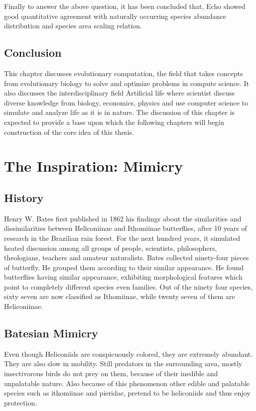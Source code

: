 \documentclass[letterpaper]{article}
\numberwithin{equation}{section}
\begin{document}
Finally to answer the above question, it has been concluded that, Echo showed good quantitative agreement with naturally occurring species abundance distribution and species area scaling relation.

\subsection{Conclusion}
This chapter discusses evolutionary computation, the field that takes concepts from evolutionary biology to solve and optimize problems in compute science. It also discusses the interdisciplinary field Artificial life where scientist discuss diverse knowledge from biology, economics, physics and use computer science to simulate and analyze life as it is in nature. The discussion of this chapter is expected to provide a base upon which the following chapters will begin construction of the core idea of this thesis.

\section{The Inspiration: Mimicry}
\label{section:mimicry}

\subsection{History}
Henry W. Bates first published in 1862 his findings about the similarities and dissimilarities between Heliconiinae and Ithomiinae butterflies, after 10 years of research in the Brazilian rain forest. For the next hundred years, it simulated heated discussion among all groups of people, scientists, philosophers, theologians, teachers and amateur naturalists. Bates collected ninety-four pieces of butterfly. He grouped them according to their similar appearance. He found butterflies having similar appearance, exhibiting morphological features which point to completely different species even families. Out of the ninety four species, sixty seven are now classified as Ithomiinae, while twenty seven of them are Heliconiinae.

\subsection{Batesian Mimicry}
Even though Heliconiids are conspicuously colored, they are extremely abundant. They are also slow in mobility. Still predators in the surrounding area, mostly insectivorous birds do not prey on them, because of their inedible and unpalatable nature. Also because of this phenomenon other edible and palatable species such as ithomiinae and pieridae, pretend to be heliconiids and thus enjoy protection.
\end{document}
